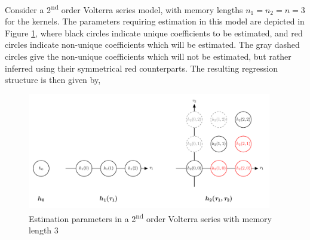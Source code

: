 Consider a 2\textsuperscript{nd} order Volterra series model, with memory lengths ${n_1=n_2=n=3}$ for the kernels. The parameters requiring estimation in this model are depicted in Figure \ref{fig:VolterraRegressionExample}, where black circles indicate unique coefficients to be estimated, and red circles indicate non-unique coefficients which will be estimated. The gray dashed circles give the non-unique coefficients which will not be estimated, but rather inferred using their symmetrical red counterparts. The resulting regression structure is then given by,
\begin{figure}[t]
\centering
\includegraphics[width = 0.95\textwidth]{Chapter3_VolterraSeries/VolterraSeriesRegressionExample.pdf}
\caption{Estimation parameters in a 2\textsuperscript{nd} order Volterra series with memory length 3}
\label{fig:VolterraRegressionExample}
\end{figure}
